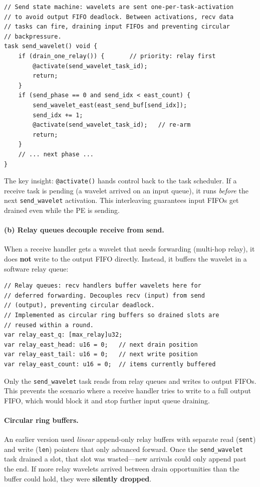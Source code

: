 \documentclass[11pt,letterpaper]{article}
\begin{document}
\begin{lstlisting}[language=CSL, caption={Current approach: one wavelet per activation}, label=lst:onesend]
// Send state machine: wavelets are sent one-per-task-activation
// to avoid output FIFO deadlock. Between activations, recv data
// tasks can fire, draining input FIFOs and preventing circular
// backpressure.
task send_wavelet() void {
    if (drain_one_relay()) {       // priority: relay first
        @activate(send_wavelet_task_id);
        return;
    }
    if (send_phase == 0 and send_idx < east_count) {
        send_wavelet_east(east_send_buf[send_idx]);
        send_idx += 1;
        @activate(send_wavelet_task_id);   // re-arm
        return;
    }
    // ... next phase ...
}
\end{lstlisting}

The key insight: \texttt{@activate()} hands control back to the task scheduler. If a receive task is pending (a wavelet arrived on an input queue), it runs \emph{before} the next \texttt{send\_wavelet} activation. This interleaving guarantees input FIFOs get drained even while the PE is sending.

\paragraph{(b) Relay queues decouple receive from send.}
When a receive handler gets a wavelet that needs forwarding (multi-hop relay), it does \textbf{not} write to the output FIFO directly. Instead, it buffers the wavelet in a software relay queue:

\begin{lstlisting}[language=CSL, numbers=none]
// Relay queues: recv handlers buffer wavelets here for
// deferred forwarding. Decouples recv (input) from send
// (output), preventing circular deadlock.
// Implemented as circular ring buffers so drained slots are
// reused within a round.
var relay_east_q: [max_relay]u32;
var relay_east_head: u16 = 0;   // next drain position
var relay_east_tail: u16 = 0;   // next write position
var relay_east_count: u16 = 0;  // items currently buffered
\end{lstlisting}

Only the \texttt{send\_wavelet} task reads from relay queues and writes to output FIFOs. This prevents the scenario where a receive handler tries to write to a full output FIFO, which would block it and stop further input queue draining.

\paragraph{Circular ring buffers.}
An earlier version used \emph{linear} append-only relay buffers with separate read (\texttt{sent}) and write (\texttt{len}) pointers that only advanced forward. Once the \texttt{send\_wavelet} task drained a slot, that slot was wasted---new arrivals could only append past the end. If more relay wavelets arrived between drain opportunities than the buffer could hold, they were \textbf{silently dropped}.
\end{document}
